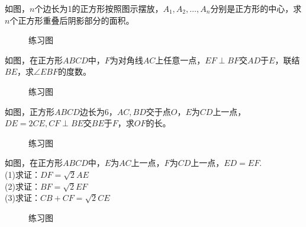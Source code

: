 \begin{problem}
如图，$n$个边长为1的正方形按照图示摆放，$A_1,A_2,…,A_n$分别是正方形的中心，求$n$个正方形重叠后阴影部分的面积。
\end{problem}
\begin{figure}[H]
    \centering
    \resizebox{4cm}{!}{}
    \caption{练习图}
\end{figure}
\begin{problem}
如图，在正方形$ABCD$中，$F$为对角线$AC$上任意一点，$EF\perp BF$交$AD$于$E$，联结$BE$，求$\angle EBF$的度数。\\
\end{problem}
\begin{figure}[H]
    \centering
    \resizebox{3cm}{!}{}
    \caption{练习图}
\end{figure}
\begin{problem}
如图，正方形$ABCD$边长为6，$AC,BD$交于点$O$，$E$为$CD$上一点，$DE=2CE,CF\perp BE$交$BE$于$F$，求$OF$的长。
\end{problem}
\begin{figure}[H]
    \centering
    \resizebox{3cm}{!}{}
    \caption{练习图}
\end{figure}
\begin{problem}
如图，在正方形$ABCD$中，$E$为$AC$上一点，$F$为$CD$上一点，$ED=EF$. \\
(1)求证：$DF=\sqrt2 AE$ \\
(2)求证：$BF=\sqrt2 EF$ \\
(3)求证：$CB+CF=\sqrt2 CE$ \\
\end{problem}
\begin{figure}[H]
    \centering
    \resizebox{3cm}{!}{}
    \caption{练习图}
\end{figure}
\clearpage
